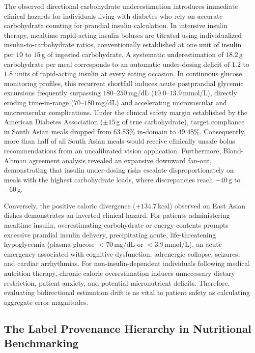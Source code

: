 \documentclass[utf8]{FrontiersinVancouver}
\begin{document}
The observed directional carbohydrate underestimation introduces immediate clinical hazards for individuals living with diabetes who rely on accurate carbohydrate counting for prandial insulin calculation. In intensive insulin therapy, mealtime rapid-acting insulin boluses are titrated using individualized insulin-to-carbohydrate ratios, conventionally established at one unit of insulin per $10$ to $15$\,g of ingested carbohydrate. A systematic underestimation of $18.2$\,g carbohydrate per meal corresponds to an automatic under-dosing deficit of $1.2$ to $1.8$ units of rapid-acting insulin at every eating occasion. In continuous glucose monitoring profiles, this recurrent shortfall induces acute postprandial glycemic excursions frequently surpassing $180\text{--}250$\,mg/dL ($10.0\text{--}13.9$\,mmol/L), directly eroding time-in-range ($70\text{--}180$\,mg/dL) and accelerating microvascular and macrovascular complications. Under the clinical safety margin established by the American Diabetes Association ($\pm 15$\,g of true carbohydrate), target compliance in South Asian meals dropped from $63.83\%$ in-domain to $49.48\%$. Consequently, more than half of all South Asian meals would receive clinically unsafe bolus recommendations from an uncalibrated vision application. Furthermore, Bland-Altman agreement analysis revealed an expansive downward fan-out, demonstrating that insulin under-dosing risks escalate disproportionately on meals with the highest carbohydrate loads, where discrepancies reach $-40$\,g to $-60$\,g.

Conversely, the positive caloric divergence ($+134.7$\,kcal) observed on East Asian dishes demonstrates an inverted clinical hazard. For patients administering mealtime insulin, overestimating carbohydrate or energy contents prompts excessive prandial insulin delivery, precipitating acute, life-threatening hypoglycemia (plasma glucose $<70$\,mg/dL or $<3.9$\,mmol/L), an acute emergency associated with cognitive dysfunction, adrenergic collapse, seizures, and cardiac arrhythmias. For non-insulin-dependent individuals following medical nutrition therapy, chronic caloric overestimation induces unnecessary dietary restriction, patient anxiety, and potential micronutrient deficits. Therefore, evaluating bidirectional estimation drift is as vital to patient safety as calculating aggregate error magnitudes.

\subsection{The Label Provenance Hierarchy in Nutritional Benchmarking}
\end{document}
